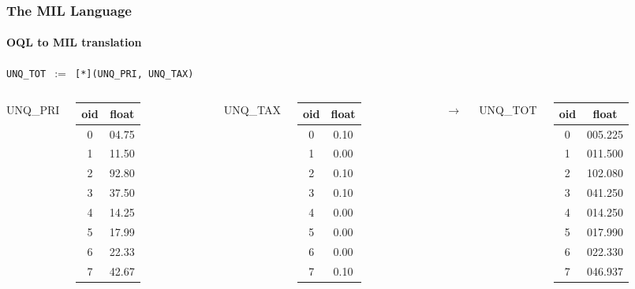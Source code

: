 \documentclass{beamer}
\begin{document}
\begin{frame}
  \frametitle{The MIL Language}
  \framesubtitle{OQL to MIL translation}

  \begin{block}{}
  {\tt UNQ\_TOT $:=$ [*](UNQ\_PRI, UNQ\_TAX)}
  \end{block}

  \begin{columns}

  \column{2cm}

  UNQ\_PRI
  \begin{tabular}{|c|c|}
    \hline
    oid & float \\
    \hline
    0 & 04.75 \\
    1 & 11.50 \\
    2 & 92.80 \\
    3 & 37.50 \\
    4 & 14.25 \\
    5 & 17.99 \\
    6 & 22.33 \\
    7 & 42.67 \\
    \hline
  \end{tabular}

  \column{1.5cm}

  UNQ\_TAX
  \begin{tabular}{|c|c|}
    \hline
    oid & float \\
    \hline
    0 & 0.10 \\
    1 & 0.00 \\
    2 & 0.10 \\
    3 & 0.10 \\
    4 & 0.00 \\
    5 & 0.00 \\
    6 & 0.00 \\
    7 & 0.10 \\
    \hline
  \end{tabular}

  \column{0.5cm}

  $\longrightarrow$

  \column{1cm}

  UNQ\_TOT
  \begin{tabular}{|c|c|}
    \hline
    oid & float \\
    \hline
    0 & 005.225 \\
    1 & 011.500 \\
    2 & 102.080 \\
    3 & 041.250 \\
    4 & 014.250 \\
    5 & 017.990 \\
    6 & 022.330 \\
    7 & 046.937 \\
    \hline
  \end{tabular}

  \end{columns}

\end{frame}
\end{document}
